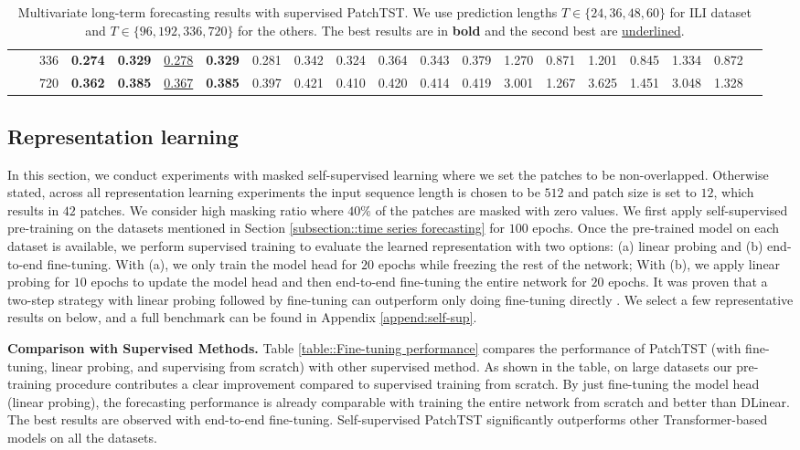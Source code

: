 \documentclass{article} \usepackage{iclr2023_conference,times}
\begin{document}
\begin{table*}[t]
{\begin{tabular}{cc|c|cc|cc|cc|cc|cc|cc|cc|ccc}
            &\multicolumn{1}{c|}{}& 336   & \textbf{0.274} & \textbf{0.329} & \uline{0.278} & \textbf{0.329} & 0.281 & 0.342 & 0.324 & 0.364 & 0.343 & 0.379 & 1.270 & 0.871 & 1.201 & 0.845 & 1.334 & 0.872 \\
            &\multicolumn{1}{c|}{}& 720   & \textbf{0.362} & \textbf{0.385} & \uline{0.367} & \textbf{0.385} & 0.397 & 0.421 & 0.410 & 0.420 & 0.414 & 0.419 & 3.001 & 1.267 & 3.625 & 1.451 & 3.048 & 1.328 \\
			\cline{2-19}
		\end{tabular}
	}
	\caption{Multivariate long-term forecasting results with supervised PatchTST. We use prediction lengths $T\in \{24, 36, 48, 60\}$ for ILI dataset and $T\in \{96, 192, 336, 720\}$ for the others. The best results are in \textbf{bold} and the second best are \uline{underlined}.}
	\label{tab:supervised}
\end{table*}
\linespread{1}


\subsection{Representation learning}

In this section, we conduct experiments with masked self-supervised learning where we set the patches to be non-overlapped. Otherwise stated, across all representation learning experiments the input sequence length is chosen to be $512$ and patch size is set to $12$, which results in $42$ patches. We consider high masking ratio where $40 \%$ of the patches are masked with zero values. We first apply self-supervised pre-training on the datasets mentioned in Section \ref{subsection::time series forecasting} for $100$ epochs. Once the pre-trained model on each dataset is available, we perform supervised training to evaluate the learned representation with two options: (a) linear probing and (b) end-to-end fine-tuning. With (a), we only train the model head for $20$ epochs while freezing the rest of the network; With (b), we apply linear probing for $10$ epochs to update the model head and then end-to-end fine-tuning the entire network for $20$ epochs. It was proven that a two-step strategy with linear probing followed by fine-tuning can outperform only doing fine-tuning directly \citep{lp-ft}. We select a few representative results on below, and a full benchmark can be found in Appendix \ref{append:self-sup}.

\textbf{Comparison with Supervised Methods.} Table \ref{table::Fine-tuning performance} compares the performance of PatchTST (with fine-tuning, linear probing, and supervising from scratch) with other supervised method. As shown in the table, on large datasets our pre-training procedure contributes a clear improvement compared to supervised training from scratch. By just fine-tuning the model head (linear probing), the forecasting performance is already comparable with training the entire network from scratch and better than DLinear. The best results are observed with end-to-end fine-tuning. Self-supervised PatchTST significantly outperforms other Transformer-based models on all the datasets. 
\end{document}
